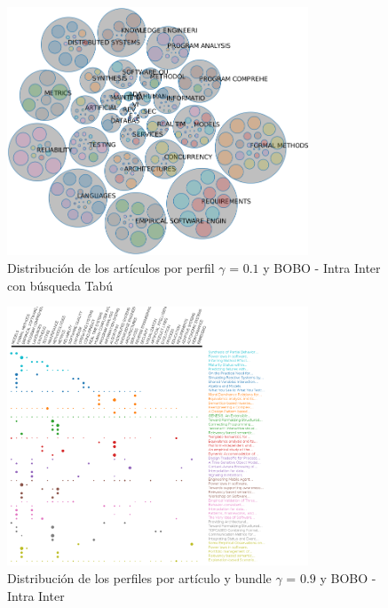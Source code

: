 \begin{figure}[H]
  \centering
    \includegraphics[width=0.8\textwidth]{resultados/papers/BOBO/INTRA_INTER/bubbles-gamma-with-local-01.png}
  \caption{Distribución de los artículos por perfil $\gamma$ = $0.1$ y BOBO - Intra Inter con búsqueda Tabú}
  \label{res:img-papers-bubbles-gamma01-hac-intra-inter-bobo}
\end{figure}

\begin{figure}[H]
  \centering
    \includegraphics[width=0.8\textwidth]{resultados/papers/BOBO/INTRA_INTER/gamma-09.png}
  \caption{Distribución de los perfiles por artículo y bundle $\gamma$ = $0.9$ y BOBO - Intra Inter}
  \label{res:img-papers-gamma09-bobo-intra-inter}
\end{figure}


